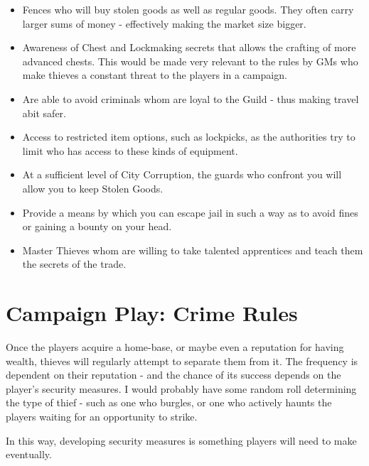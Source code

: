 \begin{multicols}{2}
\begin{itemize}
    \item Fences who will buy stolen goods as well as regular goods. They often carry larger sums of money - effectively making the market size bigger. 
    \item Awareness of Chest and Lockmaking secrets that allows the crafting of more advanced chests. This would be made very relevant to the rules by GMs who make thieves a constant threat to the players in a campaign.
    \item Are able to avoid criminals whom are loyal to the Guild - thus making travel abit safer. 
    \item Access to restricted item options, such as lockpicks, as the authorities try to limit who has access to these kinds of equipment. 
    \item At a sufficient level of City Corruption, the guards who confront you will allow you to keep Stolen Goods.
    \item Provide a means by which you can escape jail in such a way as to avoid fines or gaining a bounty on your head.
    \item Master Thieves whom are willing to take talented apprentices and teach them the secrets of the trade.
\end{itemize}

\section{Campaign Play: Crime Rules}

Once the players acquire a home-base, or maybe even a reputation for having wealth, thieves will regularly attempt to separate them from it. The frequency is dependent on their reputation - and the chance of its success depends on the player’s security measures. I would probably have some random roll determining the type of thief - such as one who burgles, or one who actively haunts the players waiting for an opportunity to strike. 

In this way, developing security measures is something players will need to make eventually. 


\end{multicols}
